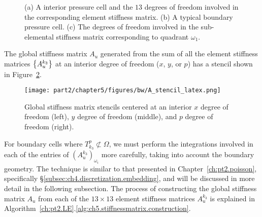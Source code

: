 \setlength{\figurewidth}{0.30\columnwidth}
\begin{figure}[htbp]
\begin{center}
\caption{(a) A interior pressure cell and the $13$ degrees of freedom involved in the corresponding element stiffness matrix. (b) A typical boundary pressure cell. (c) The degrees of freedom involved in the sub-elemental stiffness matrix corresponding to quadrant $\omega_1$. }
\label{fig:ch5:stiffnessmatrix.element}
\end{center}
\end{figure}

The global stiffness matrix $A_u$ generated from the sum of all the element stiffness matrices $\left\lbrace A_u^{k_3} \right\rbrace$ at an interior degree of freedom ($x$, $y$, or $p$) has a stencil shown in Figure~\ref{fig:ch5:stiffnessmatrix.global}.

\setlength{\figurewidth}{0.80\columnwidth}
\begin{figure}[htbp]
\begin{center}
\texttt{[image: part2/chapter5/figures/bw/A\_stencil\_latex.png]}
\caption{Global stiffness matrix stencils centered at an interior $x$ degree of freedom (left), $y$ degree of freedom (middle), and $p$ degree of freedom (right).}
\label{fig:ch5:stiffnessmatrix.global}
\end{center}
\end{figure}

For boundary cells where $T^p_{k_3} \not\subset \Omega$, we must perform the integrations involved in each of the entries of $(A_u^{k_3})_{\omega_i}$ more carefully, taking into account the boundary geometry. The technique is similar to that presented in Chapter~\ref{ch:pt2.poisson}, specifically \S\ref{subsec:ch4.discretization.embedding}, and will be discussed in more detail in the following subsection. The process of constructing the global stiffness matrix $A_u$ from each of the $13 \times 13$ element stiffness matrices $A_u^{k_3}$ is explained in Algorithm~\ref{ch:pt2.LE}.\ref{alg:ch5.stiffnessmatrix.construction}.

